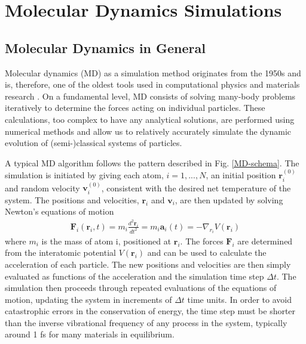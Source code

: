 \chapter{Molecular Dynamics Simulations}

\section{Molecular Dynamics in General}
Molecular dynamics (MD) as a simulation method originates from the 1950s and is, therefore, one of the oldest tools used in computational physics and materials research \cite{alder1957phase}.
On a fundamental level, MD consists of solving many-body problems iteratively to determine the forces acting on individual particles. 
These calculations, too complex to have any analytical solutions, are performed using numerical methods and allow us to relatively accurately simulate the dynamic evolution of (semi-)classical systems of particles. 

A typical MD algorithm follows the pattern described in Fig. \ref{MD-schema}. 
The simulation is initiated by giving each atom, $i=1,...,N$, an initial position $\mathbf{r}_i^{(0)}$ and random velocity $\mathbf{v}_i^{(0)}$, consistent with the desired net temperature of the system. 
The positions and velocities, $\mathbf{r}_i$ and $\mathbf{v}_i$, are then updated by solving Newton's equations of motion
\begin{align}
\mathbf{F}_i(\mathbf{r}_i,t) = m_i\frac{d^2\mathbf{r}_i}{dt^2} = m_i\mathbf{a}_i(t) = -\nabla_{r_i}V(\mathbf{r}_i)
\end{align}
where $m_i$ is the mass of atom i, positioned at $\mathbf{r}_i$. 
The forces $\mathbf{F}_i$ are determined from the interatomic potential $V(\mathbf{r}_i)$ and can be used to calculate the acceleration of each particle. 
The new positions and velocities are then simply evaluated as functions of the acceleration and the simulation time step $\Delta t$. 
The simulation then proceeds through repeated evaluations of the equations of motion, updating the system in increments of $\Delta t$ time units. 
In order to avoid catastrophic errors in the conservation of energy, the time step must be shorter than the inverse vibrational frequency of any process in the system, typically around 1 fs for many materials in equilibrium. \cite{choe2000determination}

